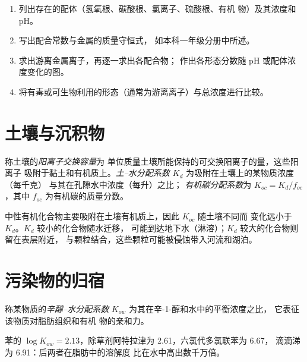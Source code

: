 \begin{method}[水体中金属的化学形态分析]\label{met:b3:environmental-toxicology:speciation}
\begin{enumerate}
  \item 列出存在的配体（氢氧根、碳酸根、氯离子、硫酸根、有机
        物）及其浓度和 pH。
  \item 写出配合常数与金属的质量守恒式，
        如本科一年级分册中所述。
  \item 求出游离金属离子，再逐一求出各配合物；
        作出各形态分数随 pH 或配体浓度变化的图。
  \item 将有毒或可生物利用的形态（通常为游离离子）与总浓度进行比较。
\end{enumerate}
\end{method}

\section{土壤与沉积物}

\begin{definition}[土壤中的吸附]\label{def:b3:environmental-toxicology:soil}
称土壤的\emph{阳离子交换容量}为
单位质量土壤所能保持的可交换阳离子的量，这些阳离子
吸附于黏土和有机质上。\emph{土–水分配系数}
$K_d$ 为吸附在土壤上的某物质浓度（每千克）
与其在孔隙水中浓度（每升）之比；
\emph{有机碳分配系数}为
$K_{oc} = K_d/f_{oc}$，其中 $f_{oc}$ 为有机碳的质量分数。
\end{definition}

中性有机化合物主要吸附在土壤有机质上，因此 $K_{oc}$ 随土壤不同而
变化远小于 $K_d$。$K_d$ 较小的化合物随水迁移，
可能到达地下水（淋溶）；$K_d$ 较大的化合物则留在表层附近，
与颗粒结合，这些颗粒可能被侵蚀带入河流和湖泊。

\section{污染物的归宿}

\begin{definition}[辛醇–水分配系数]\label{def:b3:environmental-toxicology:kow}
称某物质的\emph{辛醇–水分配系数}
$K_{ow}$ 为其在辛-1-醇和水中的平衡浓度之比，
它表征该物质对脂肪组织和有机
物的亲和力。
\end{definition}

苯的 $\log K_{ow} = 2.13$，除草剂阿特拉津为 2.61，六氯代多氯联苯为 6.67，
滴滴涕为 6.91：后两者在脂肪中的溶解度
比在水中高出数千万倍。

